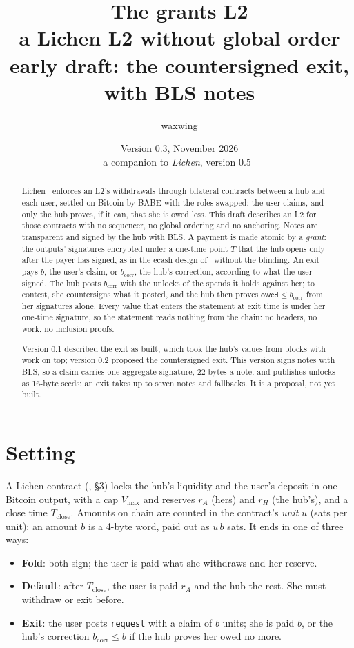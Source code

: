 \documentclass[11pt]{article}
\title{\textbf{The grants L2}\\a Lichen L2 without global order\\[2pt]\large early draft: the countersigned exit, with BLS notes}
\author{waxwing}
\date{Version 0.3, November 2026\\[2pt]\small a companion to \emph{Lichen}, version 0.5~\cite{lichen}}
\theoremstyle{plain}
\theoremstyle{definition}
\newcommand{\vmax}{V_{\max}}
\newcommand{\Tc}{T_{\mathrm{close}}}
\newcommand{\bcorr}{b_{\mathrm{corr}}}
\newcommand{\tx}[1]{\texttt{#1}}
\newcommand{\owed}{\mathsf{owed}}
\begin{document}
\maketitle

\begin{abstract}
Lichen~\cite{lichen} enforces an L2's withdrawals through bilateral
contracts between a hub and each user, settled on Bitcoin by BABE with
the roles swapped: the user claims, and only the hub proves, if it can,
that she is owed less. This draft describes an L2 for those contracts
with no sequencer, no global ordering and no anchoring. Notes are
transparent and signed by the hub with BLS. A payment is made atomic
by a \emph{grant}: the outputs' signatures encrypted under a one-time
point $T$ that the hub opens only after the payer has signed, as in
the ecash design of~\cite{ecash} without the blinding. An exit pays $b$, the user's
claim, or $\bcorr$, the hub's correction, according to what the user
signed. The hub posts $\bcorr$ with the unlocks of the spends it holds
against her; to contest, she countersigns what it posted, and the hub
then proves $\owed \le \bcorr$ from her signatures alone. Every value
that enters the statement at exit time is under her one-time
signature, so the statement reads nothing from the chain: no headers,
no work, no inclusion proofs.

Version 0.1 described the exit as built, which took the hub's values
from blocks with work on top; version 0.2 proposed the countersigned
exit. This version signs notes with BLS, so a claim carries one
aggregate signature, 22 bytes a note, and publishes unlocks as 16-byte
seeds: an exit takes up to seven notes and fallbacks. It is a proposal,
not yet built.
\end{abstract}

\tableofcontents

\section{Setting}

A Lichen contract (\cite{lichen}, \S3) locks the hub's liquidity and the
user's deposit in one Bitcoin output, with a cap $\vmax$ and reserves
$r_A$ (hers) and $r_H$ (the hub's), and a close time $\Tc$. Amounts on
chain are counted in the contract's \emph{unit} $u$ (sats per unit): an
amount $b$ is a 4-byte word, paid out as $u\,b$ sats. It ends in one of
three ways:
\begin{itemize}[nosep]
\item \textbf{Fold}: both sign; the user is paid what she withdraws and
  her reserve.
\item \textbf{Default}: after $\Tc$, the user is paid $r_A$ and the hub
  the rest. She must withdraw or exit before.
\item \textbf{Exit}: the user posts \tx{request} with a claim of $b$
  units; she is paid $b$, or the hub's correction $\bcorr \le b$ if the
  hub proves her owed no more.
\end{itemize}
\end{document}
